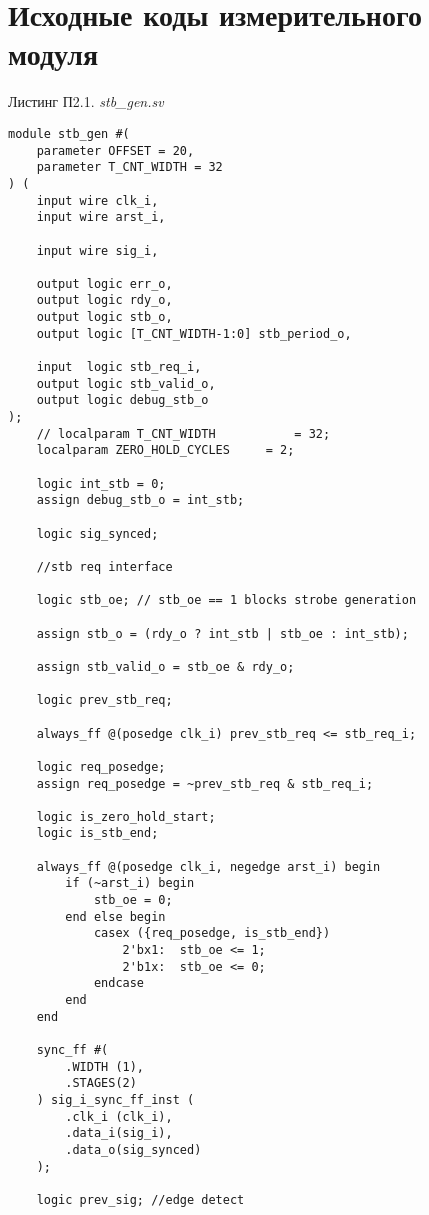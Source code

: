 \chapter{Исходные коды измерительного модуля}\label{appendix-MikTeX-TexStudio}							%

\begin{flushright}
Листинг П2.1. \emph{stb\_gen.sv}
\end{flushright}

\begin{lstlisting}
module stb_gen #(
	parameter OFFSET = 20,
	parameter T_CNT_WIDTH = 32
) (
	input wire clk_i,
	input wire arst_i,

	input wire sig_i,

	output logic err_o,
	output logic rdy_o,
	output logic stb_o,
	output logic [T_CNT_WIDTH-1:0] stb_period_o,

	input  logic stb_req_i,
	output logic stb_valid_o,
	output logic debug_stb_o
);
	// localparam T_CNT_WIDTH 			= 32;
	localparam ZERO_HOLD_CYCLES 	= 2;

	logic int_stb = 0;
	assign debug_stb_o = int_stb;

	logic sig_synced;

	//stb req interface

	logic stb_oe; // stb_oe == 1 blocks strobe generation

	assign stb_o = (rdy_o ? int_stb | stb_oe : int_stb);	

	assign stb_valid_o = stb_oe & rdy_o;

	logic prev_stb_req;

	always_ff @(posedge clk_i) prev_stb_req <= stb_req_i;

	logic req_posedge;
	assign req_posedge = ~prev_stb_req & stb_req_i;

	logic is_zero_hold_start;
	logic is_stb_end;

	always_ff @(posedge clk_i, negedge arst_i) begin
		if (~arst_i) begin
			stb_oe = 0;
		end else begin
			casex ({req_posedge, is_stb_end})			
				2'bx1:  stb_oe <= 1;
				2'b1x:	stb_oe <= 0;
			endcase
		end
	end

	sync_ff #(
		.WIDTH (1),
		.STAGES(2)
	) sig_i_sync_ff_inst (
		.clk_i (clk_i),
		.data_i(sig_i),
		.data_o(sig_synced)
	);

	logic prev_sig; //edge detect


\end{lstlisting}
